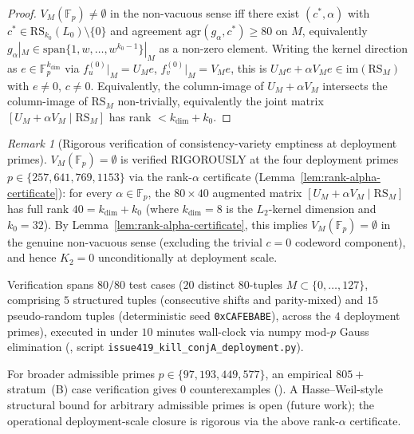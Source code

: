 \documentclass[11pt]{article}
\theoremstyle{definition}
\theoremstyle{remark}
\newtheorem{remark}[theorem]{Remark}
\begin{document}
\begin{proof}
$V_M(\mathbb{F}_p) \neq \emptyset$ in the non-vacuous sense iff there exist
$(c^*, \alpha)$ with $c^* \in \mathrm{RS}_{k_0}(L_0) \setminus \{0\}$ and
agreement $\mathrm{agr}(g_\alpha, c^*) \geq 80$ on $M$, equivalently
$g_\alpha|_M \in \mathrm{span}\{1, w, \ldots, w^{k_0 - 1}\}|_M$ as a
non-zero element. Writing the kernel direction as
$e \in \mathbb{F}_p^{k_{\dim}}$ via $f_u^{(0)}|_M = U_M e$,
$f_v^{(0)}|_M = V_M e$, this is
$U_M e + \alpha V_M e \in \mathrm{im}(\mathrm{RS}_M)$ with $e \neq 0$,
$c \neq 0$. Equivalently, the column-image of
$U_M + \alpha V_M$ intersects the column-image of $\mathrm{RS}_M$
non-trivially, equivalently the joint matrix
$[U_M + \alpha V_M \mid \mathrm{RS}_M]$ has rank
$< k_{\dim} + k_0$.
\end{proof}

\begin{remark}[Rigorous verification of consistency-variety emptiness at deployment primes]
\label{rem:V-M-empirical}
$V_M(\mathbb{F}_p) = \emptyset$ is verified RIGOROUSLY at the four deployment
primes $p \in \{257, 641, 769, 1153\}$ via the rank-$\alpha$ certificate
(Lemma~\ref{lem:rank-alpha-certificate}): for every $\alpha \in \mathbb{F}_p$,
the $80 \times 40$ augmented matrix
$[U_M + \alpha V_M \mid \mathrm{RS}_M]$ has full rank $40 = k_{\dim} + k_0$
(where $k_{\dim} = 8$ is the $L_2$-kernel dimension and $k_0 = 32$). By
Lemma~\ref{lem:rank-alpha-certificate}, this implies $V_M(\mathbb{F}_p) = \emptyset$
in the genuine non-vacuous sense (excluding the trivial $c = 0$ codeword
component), and hence $K_2 = 0$ unconditionally at deployment scale.

Verification spans $80/80$ test cases ($20$ distinct $80$-tuples
$M \subset \{0, \ldots, 127\}$, comprising $5$ structured tuples
(consecutive shifts and parity-mixed) and $15$ pseudo-random tuples
(deterministic seed \texttt{0xCAFEBABE}), across the $4$ deployment primes),
executed in under $10$ minutes wall-clock via numpy mod-$p$ Gauss elimination
(\cite{CompanionRepo}, script
\texttt{issue419\_kill\_conjA\_deployment.py}).

For broader admissible primes
$p \in \{97, 193, 449, 577\}$, an empirical $805+$ stratum~(B) case
verification gives $0$ counterexamples (\cite{CompanionRepo}).
A Hasse--Weil-style structural bound for arbitrary admissible primes is open
(future work); the operational deployment-scale closure is rigorous via the
above rank-$\alpha$ certificate.
\end{remark}
\end{document}
